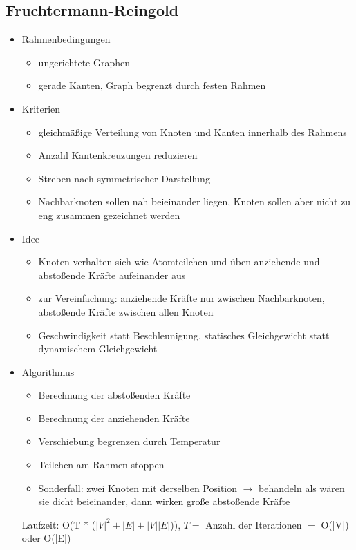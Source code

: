 \documentclass[a4paper,12pt,ngerman]{scrartcl}
\begin{document}
\subsection*{Fruchtermann-Reingold}
\begin{itemize}
\item Rahmenbedingungen
\begin{itemize}
\item ungerichtete Graphen
\item gerade Kanten, Graph begrenzt durch festen Rahmen
\end{itemize}
\item Kriterien
\begin{itemize}
\item gleichmäßige Verteilung von Knoten und Kanten innerhalb des Rahmens
\item Anzahl Kantenkreuzungen reduzieren
\item Streben nach symmetrischer Darstellung
\item Nachbarknoten sollen nah beieinander liegen, Knoten sollen aber nicht zu eng zusammen gezeichnet werden
\end{itemize}
\item Idee
\begin{itemize}
\item Knoten verhalten sich wie Atomteilchen und üben anziehende und abstoßende Kräfte aufeinander aus
\item zur Vereinfachung: anziehende Kräfte nur zwischen Nachbarknoten, abstoßende Kräfte zwischen allen Knoten
\item Geschwindigkeit statt Beschleunigung, statisches Gleichgewicht statt dynamischem Gleichgewicht
\end{itemize}
\item Algorithmus
\begin{itemize}
\item Berechnung der abstoßenden Kräfte
\item Berechnung der anziehenden Kräfte
\item Verschiebung begrenzen durch Temperatur
\item Teilchen am Rahmen stoppen
\item Sonderfall: zwei Knoten mit derselben Position $\rightarrow$ behandeln als wären sie dicht beieinander, dann wirken große abstoßende Kräfte
\end{itemize}

Laufzeit: O(T * ($|V|^2 + |E| + |V||E|$)), $T =$ Anzahl der Iterationen $=$ O(|V|) oder O(|E|)


\end{itemize}
\end{document}
